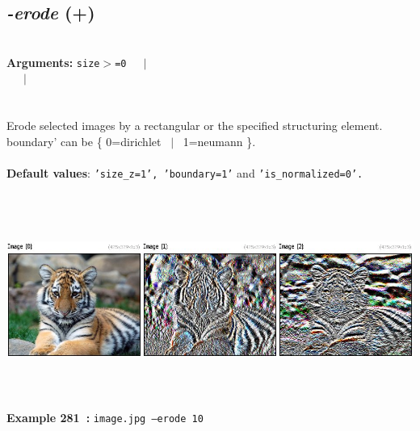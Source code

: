 \documentclass[a4paper,11pt,twoside]{book}
\begin{document}
\subsection{\emph{-erode} (+)}\vspace*{-0.5em}
~\\\textbf{Arguments: } 
{\small \texttt{size$>$=0}}~~~$|$\\
~~~$|$\\
\\~\\
Erode selected images by a rectangular or the specified structuring element.
boundary' can be \{ 0=dirichlet ~$|$~ 1=neumann \}.
~\\~\\\textbf{Default values}: {\small \texttt{'size\_z=1', 'boundary=1'} and \texttt{'is\_normalized=0'.}}
\begin{center}\includegraphics[keepaspectratio=true,height=7cm,width=\textwidth]{img/gmic_def281.jpg}\\
{\footnotesize \textbf{Example 281~:} \texttt{image.jpg --erode 10}}
\end{center}
\end{document}
